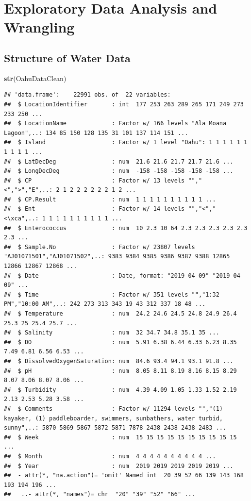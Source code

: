 \documentclass[12pt,]{article}
\newenvironment{Shaded}{\begin{snugshade}}{\end{snugshade}}
\newcommand{\KeywordTok}[1]{\textcolor[rgb]{0.13,0.29,0.53}{\textbf{#1}}}
\newcommand{\NormalTok}[1]{#1}
\begin{document}
\newpage

\section{Exploratory Data Analysis and
Wrangling}\label{exploratory-data-analysis-and-wrangling-1}

\subsection{Structure of Water Data}\label{structure-of-water-data}

\begin{Shaded}
\begin{Highlighting}[]
\KeywordTok{str}\NormalTok{(OahuDataClean)}
\end{Highlighting}
\end{Shaded}

\begin{verbatim}
## 'data.frame':    22991 obs. of  22 variables:
##  $ LocationIdentifier       : int  177 253 263 289 265 171 249 273 233 250 ...
##  $ LocationName             : Factor w/ 166 levels "Ala Moana Lagoon",..: 134 85 150 128 135 31 101 137 114 151 ...
##  $ Island                   : Factor w/ 1 level "Oahu": 1 1 1 1 1 1 1 1 1 1 ...
##  $ LatDecDeg                : num  21.6 21.6 21.7 21.7 21.6 ...
##  $ LongDecDeg               : num  -158 -158 -158 -158 -158 ...
##  $ CP                       : Factor w/ 13 levels "","<",">","E",..: 2 1 2 2 2 2 2 2 1 2 ...
##  $ CP.Result                : num  1 1 1 1 1 1 1 1 1 1 ...
##  $ Ent                      : Factor w/ 14 levels "","<","<\xca",..: 1 1 1 1 1 1 1 1 1 1 ...
##  $ Enterococcus             : num  10 2.3 10 64 2.3 2.3 2.3 2.3 2.3 2.3 ...
##  $ Sample.No                : Factor w/ 23807 levels "AJ01071501","AJ01071502",..: 9383 9384 9385 9386 9387 9388 12865 12866 12867 12868 ...
##  $ Date                     : Date, format: "2019-04-09" "2019-04-09" ...
##  $ Time                     : Factor w/ 351 levels "","1:32 PM","10:00 AM",..: 242 273 313 343 19 43 312 337 18 48 ...
##  $ Temperature              : num  24.2 24.6 24.5 24.8 24.9 26.4 25.3 25 25.4 25.7 ...
##  $ Salinity                 : num  32 34.7 34.8 35.1 35 ...
##  $ DO                       : num  5.91 6.38 6.44 6.33 6.23 8.35 7.49 6.81 6.56 6.53 ...
##  $ DissolvedOxygenSaturation: num  84.6 93.4 94.1 93.1 91.8 ...
##  $ pH                       : num  8.05 8.11 8.19 8.16 8.15 8.29 8.07 8.06 8.07 8.06 ...
##  $ Turbidity                : num  4.39 4.09 1.05 1.33 1.52 2.19 2.13 2.53 5.28 3.58 ...
##  $ Comments                 : Factor w/ 11294 levels "","(1) kayaker, (1) paddleboarder, swimmers, sunbathers, water turbid, sunny",..: 5870 5869 5867 5872 5871 7878 2438 2438 2438 2483 ...
##  $ Week                     : num  15 15 15 15 15 15 15 15 15 15 ...
##  $ Month                    : num  4 4 4 4 4 4 4 4 4 4 ...
##  $ Year                     : num  2019 2019 2019 2019 2019 ...
##  - attr(*, "na.action")= 'omit' Named int  20 39 52 66 139 143 168 193 194 196 ...
##   ..- attr(*, "names")= chr  "20" "39" "52" "66" ...
\end{verbatim}
\end{document}
